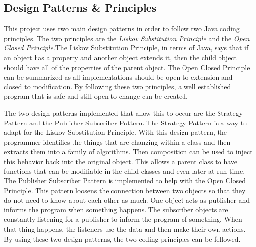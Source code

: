 \documentclass{article}
\begin{document}
\subsection{Design Patterns \& Principles}
	This project uses two main design patterns in order to follow two Java coding principles. The two principles are the \textit{Liskov Substitution Principle} and the \textit{Open Closed Principle}.The Liskov Substitution Principle, in terms of Java, says that if an object has a property and another object extends it, then the child object should have all of the properties of the parent object. The Open Closed Principle can be summarized as all implementations should be open to extension and closed to modification. By following these two principles, a well established program that is safe and still open to change can be created. \par
	The two design patterns implemented that allow this to occur are the Strategy Pattern and the Publisher Subscriber Pattern. The Strategy Pattern is a way to adapt for the Liskov Substitution Principle. With this design pattern, the programmer identifies the things that are changing within a class and then extracts them into a family of algorithms. Then composition can be used to inject this behavior back into the original object. This allows a parent class to have functions that can be modifiable in the child classes and even later at run-time. The Publisher Subscriber Pattern is implemented to help with the Open Closed Principle. This pattern loosens the connection between two objects so that they do not need to know about each other as much. One object acts as publisher and informs the program when something happens. The subscriber objects are constantly listening for a publisher to inform the program of something. When that thing happens, the listeners use the data and then make their own actions. By using these two design patterns, the two coding principles can be followed.  
\end{document}
